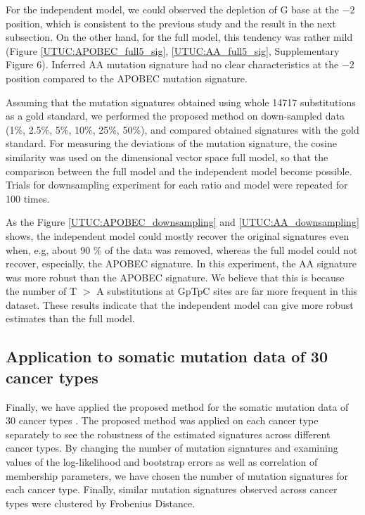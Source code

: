 For the independent model, we could observed the depletion of G base at the $-2$ position,
which is consistent to the previous study \cite{pmid23318258} and the result in the next subsection.
On the other hand, for the full model, this tendency was rather mild (Figure \ref{UTUC:APOBEC_full5_sig}, \ref{UTUC:AA_full5_sig}, Supplementary Figure 6).
Inferred AA mutation signature had no clear characteristics at the $-2$ position compared to the APOBEC mutation signature.


Assuming that the mutation signatures obtained using whole 14717 substitutions as a gold standard, 
we performed the proposed method on down-sampled data (1\%, 2.5\%, 5\%, 10\%, 25\%, 50\%), 
and compared obtained signatures with the gold standard.
For measuring the deviations of the mutation signature, the cosine similarity was used on the dimensional vector space full model,
so that the comparison between the full model and the independent model become possible.
Trials for downsampling experiment for each ratio and model were repeated for 100 times.


As the Figure \ref{UTUC:APOBEC_downsampling} and \ref{UTUC:AA_downsampling} shows, 
the independent model could mostly recover the original signatures even when, e.g, about 90 \% of the data was removed,
whereas the full model could not recover, especially, the APOBEC signature.
In this experiment, the AA signature was more robust than the APOBEC signature.
We believe that this is because the number of T $>$ A substitutions at GpTpC sites are far more frequent in this dataset.
These results indicate that the independent model can give more robust estimates than the full model.


\subsection*{Application to somatic mutation data of 30 cancer types}
 
Finally, we have applied the proposed method for the somatic mutation data of 30 cancer types \cite{pmid23945592}.
The proposed method was applied on each cancer type separately to see the robustness of the estimated signatures across different cancer types.
By changing the number of mutation signatures and examining values of the log-likelihood and bootstrap errors as well as correlation of membership parameters,
we have chosen the number of mutation signatures for each cancer type.
Finally, similar mutation signatures observed across cancer types were clustered by Frobenius Distance.



